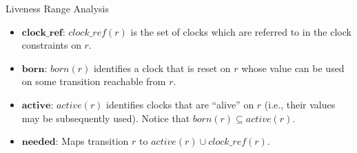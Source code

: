 \documentclass[10pt]{beamer}
\theoremstyle{plain}
\theoremstyle{definition}
\newcommand*{\Var}[1]{\ensuremath{\mathit{#1}}}
\newcommand*{\Active}{\Var{active}}
\newcommand*{\Born}{\Var{born}}
\begin{document}
\begin{frame}{Liveness Range Analysis}
	\begin{itemize}
		\item
		$\mathit{\textbf{clock\_ref}}$: $\mathit{clock\_ref(r)}$ is the set of clocks which are referred to in the clock constraints on $r$.
		
		\item
		$\textbf{born}$: $\Born(r)$ identifies a clock that is reset on $r$  whose value can be used on some transition	reachable from $r$.
	
		\item 
		$\textbf{active}$: $\Active(r)$ identifies clocks that are ``alive'' on $r$ (i.e., their  values may be subsequently used). Notice that $\Born(r)\subseteq \Active(r)$.
		
		\item
		$\textbf{needed}$: Maps transition $r$ to $\Active(r)\cup \mathit{clock\_ref(r)}$.
		
	\end{itemize}
\end{frame}
\end{document}
